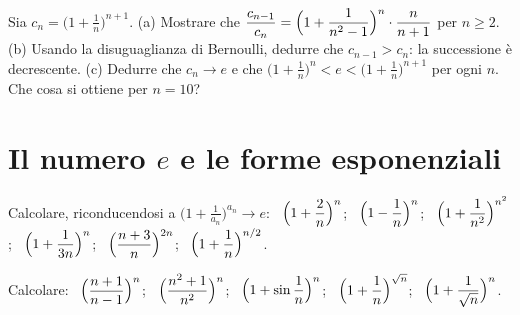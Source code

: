 \begin{esercizio}[\liv{3}]
Sia $c_n=\bigl(1+\frac1n\bigr)^{n+1}$. (a) Mostrare che $\dfrac{c_{n-1}}{c_n}=\Bigl(1+\dfrac1{n^2-1}\Bigr)^n\cdot\dfrac n{n+1}$ per $n\ge2$. (b) Usando la disuguaglianza di Bernoulli, dedurre che $c_{n-1}>c_n$: la successione è decrescente. (c) Dedurre che $c_n\to e$ e che $\bigl(1+\frac1n\bigr)^n<e<\bigl(1+\frac1n\bigr)^{n+1}$ per ogni $n$. Che cosa si ottiene per $n=10$?
\end{esercizio}

\section{Il numero $e$ e le forme esponenziali}

\begin{esercizio}[\liv{1}]
Calcolare, riconducendosi a $\bigl(1+\frac1{a_n}\bigr)^{a_n}\to e$: \ $\Bigl(1+\dfrac2n\Bigr)^n$; \ $\Bigl(1-\dfrac1n\Bigr)^n$; \ $\Bigl(1+\dfrac1{n^2}\Bigr)^{n^2}$; \ $\Bigl(1+\dfrac1{3n}\Bigr)^n$; \ $\Bigl(\dfrac{n+3}n\Bigr)^{2n}$; \ $\Bigl(1+\dfrac1n\Bigr)^{n/2}$.
\end{esercizio}

\begin{esercizio}[\liv{2}]
Calcolare: \ $\Bigl(\dfrac{n+1}{n-1}\Bigr)^n$; \ $\Bigl(\dfrac{n^2+1}{n^2}\Bigr)^n$; \ $\Bigl(1+\sin\dfrac1n\Bigr)^n$; \ $\Bigl(1+\dfrac1n\Bigr)^{\sqrt n}$; \ $\Bigl(1+\dfrac1{\sqrt n}\Bigr)^n$.
\end{esercizio}

